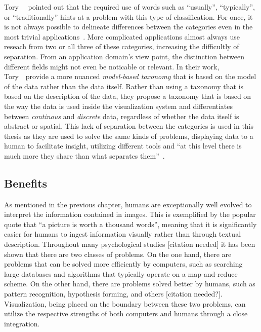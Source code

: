 \noindent Tory~\etal~\cite{tory2002model} pointed out that the required use of words such as ``usually'', ``typically'', or ``traditionally'' hints at a problem with this type of classification.  For once, it is not always possible to delineate differences between the categories even in the most trivial applications~\cite{rhyne2003information, weiskopf2006scivis}.  More complicated applications almost always use reseach from two or all three of these categories, increasing the difficultly of separation.  From an application domain's view point, the distinction between different fields might not even be noticable or relevant.  In their work, Tory~\etal~provide a more nuanced \emph{model-based taxonomy} that is based on the model of the data rather than the data itself.  Rather than using a taxonomy that is based on the description of the data, they propose a taxonomy that is based on the way the data is used inside the visualization system and differentiates between \emph{continous} and \emph{discrete} data, regardless of whether the data itself is abstract or spatial.  This lack of separation between the categories is used in this thesis as they are used to solve the same kinds of problems, displaying data to a human to facilitate insight, utilizing different tools and ``at this level there is much more they share than what separates them''~\cite{van2006views}.

\subsection{Benefits} \label{cha:intro:vis:benefits}
As mentioned in the previous chapter, humans are exceptionally well evolved to interpret the information contained in images.  This is exemplified by the popular quote that ``a picture is worth a thousand words'', meaning that it is significantly easier for humans to ingest information visually rather than through textual description.  Throughout many psychological studies [citation needed] it has been shown that there are two classes of problems.  On the one hand, there are problems that can be solved more efficiently by computers, such as searching large databases and algorithms that typically operate on a map-and-reduce scheme.  On the other hand, there are problems solved better by humans, such as pattern recognition, hypothesis forming, and others [citation needed?].  Visualization, being placed on the boundary between these two problems, can utilize the respective strengths of both computers and humans through a close integration.

